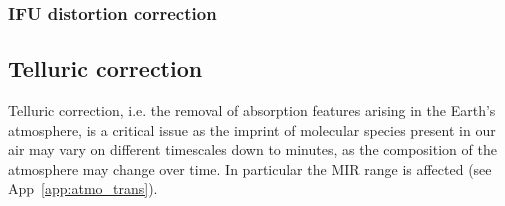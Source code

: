 

\subsubsection{IFU distortion correction}\label{ssec:criticalwavelengthanddistortionifu}


\subsection{Telluric correction}\label{ssec:criticaltelluriccorrection}
Telluric correction, i.e. the removal of absorption features arising in the Earth's atmosphere,
is a critical issue as the imprint of molecular species present in our air may vary on different timescales
down to minutes, as the composition of the atmosphere may change over time.
In particular the \ac{MIR} range is affected (see App~\ref{app:atmo_trans}).

